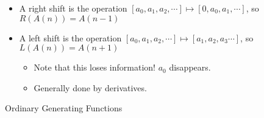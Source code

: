 \begin{itemize}
\tightlist
\item
  A right shift is the operation
  \([a_0, a_1, a_2, \cdots] \mapsto [0, a_0, a_1, \cdots]\), so
  \(R(A(n)) = A(n-1)\)
\item
  A left shift is the operation
  \([a_0, a_1, a_2, \cdots] \mapsto [a_1, a_2, a_3 \cdots]\), so
  \(L(A(n)) = A(n+1)\)

  \begin{itemize}
  \tightlist
  \item
    Note that this loses information! \(a_0\) disappears.
  \item
    Generally done by derivatives.
  \end{itemize}
\end{itemize}

Ordinary Generating Functions

